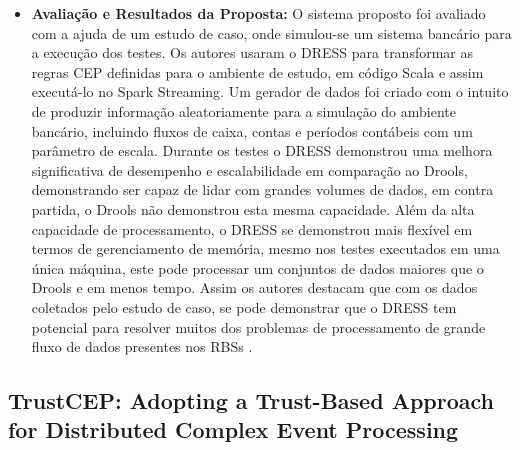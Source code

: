 \documentclass[tid,table]{texufpel} %
\begin{document}
\begin{itemize}
	\item \textbf{Avaliação e Resultados da Proposta:} O sistema proposto foi avaliado com a ajuda de um estudo de caso, onde simulou-se um sistema bancário para a execução dos testes. Os autores usaram o DRESS para transformar as regras CEP definidas para o ambiente de estudo, em código Scala e assim executá-lo no Spark Streaming. Um gerador de dados foi criado com o intuito de produzir informação aleatoriamente para a simulação do ambiente bancário, incluindo fluxos de caixa, contas e períodos contábeis com um parâmetro de escala. Durante os testes o DRESS demonstrou uma melhora significativa de desempenho e escalabilidade em comparação ao Drools, demonstrando ser capaz de lidar com grandes volumes de dados, em contra partida, o Drools não demonstrou esta mesma capacidade. Além  da alta capacidade de processamento, o DRESS se demonstrou mais flexível em termos de gerenciamento de memória, mesmo nos testes executados em uma única máquina, este pode processar um conjuntos de dados maiores que o Drools e em menos tempo. Assim os autores destacam que com os dados coletados pelo estudo de caso, se pode demonstrar que o DRESS tem potencial para resolver muitos dos problemas de processamento de grande fluxo de dados presentes nos RBSs \cite{art5chen2016dress}.
	
\end{itemize}

\subsection{TrustCEP: Adopting a Trust-Based Approach for Distributed Complex Event Processing}
\end{document}

